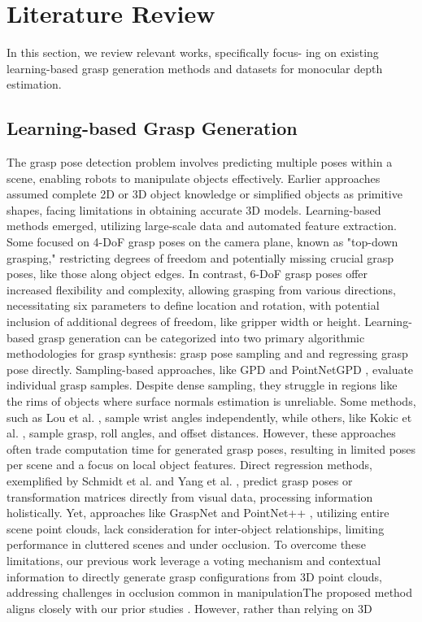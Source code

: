 \section{Literature Review}
\label{sec:relatedwork}

In this section, we review relevant works, specifically focus-
ing on existing learning-based grasp generation methods and datasets for monocular depth estimation.

\subsection{Learning-based Grasp Generation}

The grasp pose detection problem involves predicting multiple poses within a scene, enabling robots to manipulate objects effectively. Earlier approaches \cite{bicchi2000robotic, miller2003automatic} assumed complete 2D or 3D object knowledge or simplified objects as primitive shapes, facing limitations in obtaining accurate 3D models. Learning-based methods emerged, utilizing large-scale data and automated feature extraction. Some focused on 4-DoF grasp poses on the camera plane, known as "top-down grasping," restricting degrees of freedom and potentially missing crucial grasp poses, like those along object edges. In contrast, 6-DoF grasp poses offer increased flexibility and complexity, allowing grasping from various directions, necessitating six parameters to define location and rotation, with potential inclusion of additional degrees of freedom, like gripper width or height. Learning-based grasp generation can be categorized into two primary algorithmic methodologies for grasp synthesis: grasp pose sampling and and regressing grasp pose directly. Sampling-based approaches, like GPD \cite{ten2017grasp} and PointNetGPD \cite{liang2019pointnetgpd}, evaluate individual grasp samples. Despite dense sampling, they struggle in regions like the rims of objects where surface normals estimation is unreliable. Some methods, such as Lou et al. \cite{lou2020learning}, sample wrist angles independently, while others, like Kokic et al. \cite{kokic2020learning}, sample grasp, roll angles, and offset distances. However, these approaches often trade computation time for generated grasp poses, resulting in limited poses per scene and a focus on local object features. Direct regression methods, exemplified by Schmidt et al. \cite{schmidt2018grasping} and Yang et al. \cite{yang2021robotic}, predict grasp poses or transformation matrices directly from visual data, processing information holistically. Yet, approaches like GraspNet \cite{fang2020graspnet} and PointNet++ \cite{ni2020pointnet++}, utilizing entire scene point clouds, lack consideration for inter-object relationships, limiting performance in cluttered scenes and under occlusion. To overcome these limitations, our previous work \cite{hoang2023grasp, hoang2022context} leverage a voting mechanism and contextual information to directly generate grasp configurations from 3D point clouds, addressing challenges in occlusion common in manipulationThe proposed method aligns closely with our prior studies \cite{hoang2023grasp, hoang2022context}. However, rather than relying on 3D 
